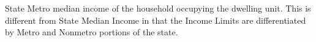 State Metro median income of the household occupying the dwelling unit.             This is different from State Median Income in that the Income Limits are differentiated by Metro and             Nonmetro portions of the state.
